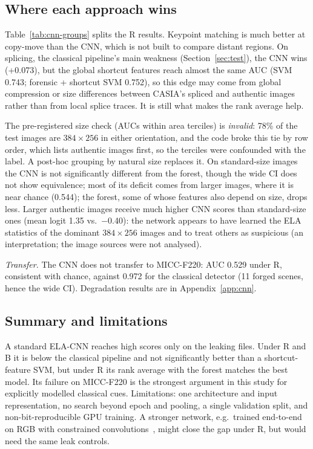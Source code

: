 \subsection{Where each approach wins}\label{sec:cnn-groups}

Table~\ref{tab:cnn-groups} splits the R results. Keypoint matching is much better at copy-move than the CNN, which is
not built to compare distant regions. On splicing, the classical pipeline's main weakness (Section~\ref{sec:test}), the
CNN wins (+0.073), but the global shortcut features reach almost the same AUC (SVM 0.743; forensic + shortcut SVM
0.752), so this edge may come from global compression or size differences between CASIA's spliced and authentic
images rather than from local splice traces. It is still what makes the rank average help.

The pre-registered size check (AUCs within area terciles) is \emph{invalid}: 78\% of the test images are
$384\times256$ in either orientation, and the code broke this tie by row order, which lists authentic images first, so
the terciles were confounded with the label. A post-hoc grouping by natural size replaces it. On standard-size images
the CNN is not significantly different from the forest, though the wide CI does not show equivalence; most of its
deficit comes from larger images, where it is near chance (0.544); the forest, some of whose features also depend on
size, drops less. Larger authentic images receive much higher CNN scores than standard-size ones (mean logit 1.35
vs.\ $-$0.40): the network appears to have learned the ELA statistics of the dominant $384\times256$ images and to
treat others as suspicious (an interpretation; the image sources were not analysed).

\emph{Transfer.} The CNN does not transfer to MICC-F220: AUC 0.529 under R, consistent with chance,
against 0.972 for the classical detector (11 forged scenes, hence the wide CI). Degradation results are in
Appendix~\ref{app:cnn}.

\subsection{Summary and limitations}\label{sec:cnn-summary}

A standard ELA-CNN reaches high scores only on the leaking files. Under R and B it is below the
classical pipeline and not significantly better than a shortcut-feature SVM, but under R its rank average with the
forest matches the best model. Its failure on MICC-F220 is the strongest argument in this study for explicitly modelled
classical cues. Limitations: one architecture and input representation, no search beyond epoch and pooling, a single
validation split, and non-bit-reproducible GPU training. A stronger network, e.g.\ trained end-to-end on RGB with
constrained convolutions~\cite{bayar2016constrained}, might close the gap under R, but would need the same leak
controls.
